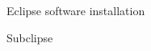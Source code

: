 \documentclass[11pt]{article}
\begin{document}
\begin{figure}
\caption{\label{fig:eclipse2} Eclipse software installation }
\end{figure}

\begin{figure}
\caption{\label{fig:eclipse3} Subclipse }
\end{figure}
\end{document}
